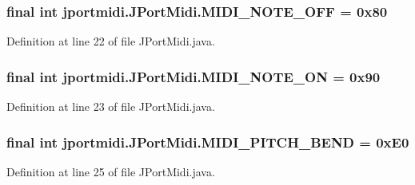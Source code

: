 \subsubsection[{\texorpdfstring{M\+I\+D\+I\+\_\+\+N\+O\+T\+E\+\_\+\+O\+FF}{MIDI_NOTE_OFF}}]{\setlength{\rightskip}{0pt plus 5cm}final {\bf int} jportmidi.\+J\+Port\+Midi.\+M\+I\+D\+I\+\_\+\+N\+O\+T\+E\+\_\+\+O\+FF = 0x80}\hypertarget{classjportmidi_1_1_j_port_midi_a20f46c0eb31368fcc44d3faa36b0eca0}{}\label{classjportmidi_1_1_j_port_midi_a20f46c0eb31368fcc44d3faa36b0eca0}


Definition at line 22 of file J\+Port\+Midi.\+java.

\subsubsection[{\texorpdfstring{M\+I\+D\+I\+\_\+\+N\+O\+T\+E\+\_\+\+ON}{MIDI_NOTE_ON}}]{\setlength{\rightskip}{0pt plus 5cm}final {\bf int} jportmidi.\+J\+Port\+Midi.\+M\+I\+D\+I\+\_\+\+N\+O\+T\+E\+\_\+\+ON = 0x90}\hypertarget{classjportmidi_1_1_j_port_midi_a9e213d74cd513bb2e1454de23b04405e}{}\label{classjportmidi_1_1_j_port_midi_a9e213d74cd513bb2e1454de23b04405e}


Definition at line 23 of file J\+Port\+Midi.\+java.

\subsubsection[{\texorpdfstring{M\+I\+D\+I\+\_\+\+P\+I\+T\+C\+H\+\_\+\+B\+E\+ND}{MIDI_PITCH_BEND}}]{\setlength{\rightskip}{0pt plus 5cm}final {\bf int} jportmidi.\+J\+Port\+Midi.\+M\+I\+D\+I\+\_\+\+P\+I\+T\+C\+H\+\_\+\+B\+E\+ND = 0x\+E0}\hypertarget{classjportmidi_1_1_j_port_midi_a91d3e83020eecd07768efe050692c98a}{}\label{classjportmidi_1_1_j_port_midi_a91d3e83020eecd07768efe050692c98a}


Definition at line 25 of file J\+Port\+Midi.\+java.

